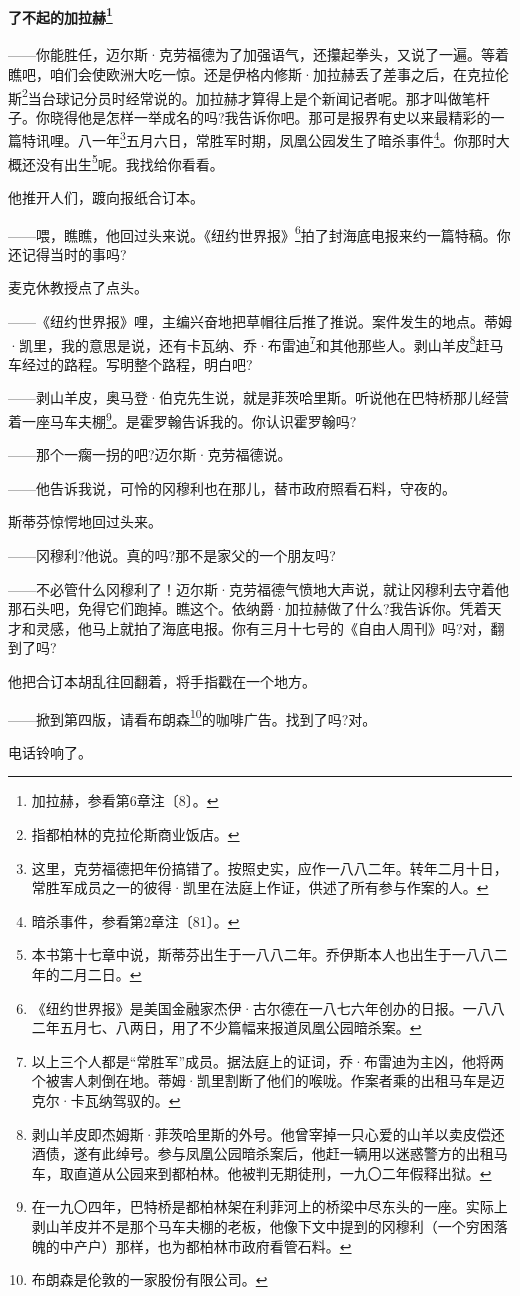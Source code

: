 \paragraph*{了不起的加拉赫\footnote{加拉赫，参看第6章注〔8〕。}}
\par ——你能胜任，迈尔斯·克劳福德为了加强语气，还攥起拳头，又说了一遍。等着瞧吧，咱们会使欧洲大吃一惊。还是伊格内修斯·加拉赫丢了差事之后，在克拉伦斯\footnote{指都柏林的克拉伦斯商业饭店。}当台球记分员时经常说的。加拉赫才算得上是个新闻记者呢。那才叫做笔杆子。你晓得他是怎样一举成名的吗?我告诉你吧。那可是报界有史以来最精彩的一篇特讯哩。八一年\footnote{这里，克劳福德把年份搞错了。按照史实，应作一八八二年。转年二月十日，常胜军成员之一的彼得·凯里在法庭上作证，供述了所有参与作案的人。}五月六日，常胜军时期，凤凰公园发生了暗杀事件\footnote{暗杀事件，参看第2章注〔81〕。}。你那时大概还没有出生\footnote{本书第十七章中说，斯蒂芬出生于一八八二年。乔伊斯本人也出生于一八八二年的二月二日。}呢。我找给你看看。
\par 他推开人们，踱向报纸合订本。
\par ——喂，瞧瞧，他回过头来说。《纽约世界报》\footnote{《纽约世界报》是美国金融家杰伊·古尔德在一八七六年创办的日报。一八八二年五月七、八两日，用了不少篇幅来报道凤凰公园暗杀案。}拍了封海底电报来约一篇特稿。你还记得当时的事吗?
\par 麦克休教授点了点头。
\par ——《纽约世界报》哩，主编兴奋地把草帽往后推了推说。案件发生的地点。蒂姆·凯里，我的意思是说，还有卡瓦纳、乔·布雷迪\footnote{以上三个人都是“常胜军”成员。据法庭上的证词，乔·布雷迪为主凶，他将两个被害人刺倒在地。蒂姆·凯里割断了他们的喉咙。作案者乘的出租马车是迈克尔·卡瓦纳驾驭的。}和其他那些人。剥山羊皮\footnote{剥山羊皮即杰姆斯·菲茨哈里斯的外号。他曾宰掉一只心爱的山羊以卖皮偿还酒债，遂有此绰号。参与凤凰公园暗杀案后，他赶一辆用以迷惑警方的出租马车，取直道从公园来到都柏林。他被判无期徒刑，一九〇二年假释出狱。}赶马车经过的路程。写明整个路程，明白吧?
\par ——剥山羊皮，奥马登·伯克先生说，就是菲茨哈里斯。听说他在巴特桥那儿经营着一座马车夫棚\footnote{在一九〇四年，巴特桥是都柏林架在利菲河上的桥梁中尽东头的一座。实际上剥山羊皮并不是那个马车夫棚的老板，他像下文中提到的冈穆利（一个穷困落魄的中产户）那样，也为都柏林市政府看管石料。}。是霍罗翰告诉我的。你认识霍罗翰吗?
\par ——那个一瘸一拐的吧?迈尔斯·克劳福德说。
\par ——他告诉我说，可怜的冈穆利也在那儿，替市政府照看石料，守夜的。
\par 斯蒂芬惊愕地回过头来。
\par ——冈穆利?他说。真的吗?那不是家父的一个朋友吗?
\par ——不必管什么冈穆利了！迈尔斯·克劳福德气愤地大声说，就让冈穆利去守着他那石头吧，免得它们跑掉。瞧这个。依纳爵·加拉赫做了什么?我告诉你。凭着天才和灵感，他马上就拍了海底电报。你有三月十七号的《自由人周刊》吗?对，翻到了吗?
\par 他把合订本胡乱往回翻着，将手指戳在一个地方。
\par ——掀到第四版，请看布朗森\footnote{布朗森是伦敦的一家股份有限公司。}的咖啡广告。找到了吗?对。
\par 电话铃响了。
